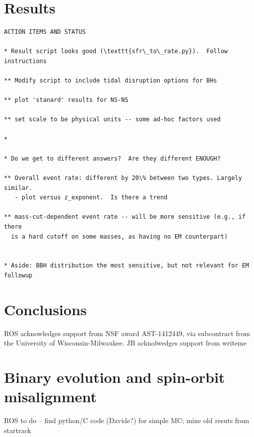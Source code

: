 \documentclass[nofootinbib,twocolumn,prd]{emulateapj}
\newcommand\editremark[1]{{\color{red}#1}}
\begin{document}
\section{Results}
\label{sec:results}


\begin{verbatim}
ACTION ITEMS AND STATUS

* Result script looks good (\texttt{sfr\_to\_rate.py}).  Follow instructions

** Modify script to include tidal disruption options for BHs

** plot 'stanard' results for NS-NS

** set scale to be physical units -- some ad-hoc factors used

*

* Do we get to different answers?  Are they different ENOUGH?  

** Overall event rate: different by 20\% between two types. Largely similar.
   - plot versus z_exponent.  Is there a trend

** mass-cut-dependent event rate -- will be more sensitive (e.g., if there
  is a hard cutoff on some masses, as having no EM counterpart)


* Aside: BBH distribution the most sensitive, but not relevant for EM followup
\end{verbatim}


\section{Conclusions}





\begin{acknowledgements}
ROS acknowledges support from NSF award AST-1412449, via subcontract from the University of Wisconsin-Milwaukee.
%
JB acknolwedges support  from \editremark{writeme}
\end{acknowledgements}

\appendix
\section{Binary evolution and spin-orbit misalignment}

\editremark{ROS to do} -- find python/C code (Davide?) for simple MC; mine old resuts from startrack

\end{document}
